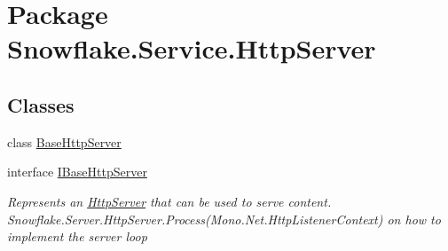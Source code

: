 \hypertarget{namespace_snowflake_1_1_service_1_1_http_server}{}\section{Package Snowflake.\+Service.\+Http\+Server}
\label{namespace_snowflake_1_1_service_1_1_http_server}
\subsection*{Classes}
\begin{DoxyCompactItemize}
\item 
class \hyperlink{class_snowflake_1_1_service_1_1_http_server_1_1_base_http_server}{Base\+Http\+Server}
\item 
interface \hyperlink{interface_snowflake_1_1_service_1_1_http_server_1_1_i_base_http_server}{I\+Base\+Http\+Server}
\begin{DoxyCompactList}\small\item\em Represents an \hyperlink{namespace_snowflake_1_1_service_1_1_http_server}{Http\+Server} that can be used to serve content. Snowflake.\+Server.\+Http\+Server.\+Process(\+Mono.\+Net.\+Http\+Listener\+Context) on how to implement the server loop \end{DoxyCompactList}\end{DoxyCompactItemize}
